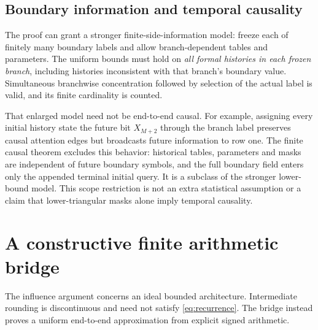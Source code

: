 \documentclass[11pt,letterpaper]{article}
\theoremstyle{definition}\newtheorem{definition}[theorem]{Definition}
\theoremstyle{remark}\newtheorem{remark}[theorem]{Remark}
\begin{document}
\subsection{Boundary information and temporal causality}
The proof can grant a stronger finite-side-information model: freeze each of finitely many boundary labels and allow branch-dependent tables and parameters. The uniform bounds must hold on \emph{all formal histories in each frozen branch}, including histories inconsistent with that branch's boundary value. Simultaneous branchwise concentration followed by selection of the actual label is valid, and its finite cardinality is counted.

That enlarged model need not be end-to-end causal. For example, assigning every initial history state the future bit $X_{M+2}$ through the branch label preserves causal attention edges but broadcasts future information to row one. The finite causal theorem excludes this behavior: historical tables, parameters and masks are independent of future boundary symbols, and the full boundary field enters only the appended terminal initial query. It is a subclass of the stronger lower-bound model. This scope restriction is not an extra statistical assumption or a claim that lower-triangular masks alone imply temporal causality.

\section{A constructive finite arithmetic bridge}\label{sec:arithmetic}
The influence argument concerns an ideal bounded architecture. Intermediate rounding is discontinuous and need not satisfy \eqref{eq:recurrence}. The bridge instead proves a uniform end-to-end approximation from explicit signed arithmetic.
\end{document}
